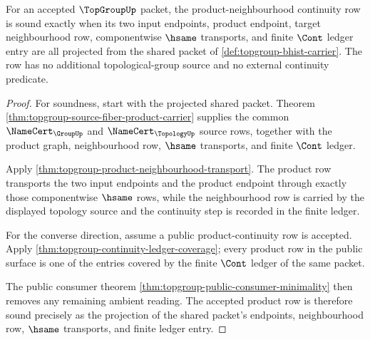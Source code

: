 \begin{theorem}
\label{thm:topgroup-product-cont-ledger-soundness}
For an accepted $\TopGroupUp$ packet, the product-neighbourhood continuity row
is sound exactly when its two input endpoints, product endpoint, target
neighbourhood row, componentwise $\hsame$ transports, and finite $\Cont$ ledger
entry are all projected from the shared packet of
\autoref{def:topgroup-bhist-carrier}. The row has no additional topological-group
source and no external continuity predicate.
\end{theorem}
\begin{proof}
For soundness, start with the projected shared packet. Theorem
\autoref{thm:topgroup-source-fiber-product-carrier} supplies the common
$\NameCert_{\GroupUp}$ and $\NameCert_{\TopologyUp}$ source rows, together with
the product graph, neighbourhood row, $\hsame$ transports, and finite
$\Cont$ ledger.

Apply \autoref{thm:topgroup-product-neighbourhood-transport}. The product row
transports the two input endpoints and the product endpoint through exactly
those componentwise $\hsame$ rows, while the neighbourhood row is carried by the
displayed topology source and the continuity step is recorded in the finite
ledger.

For the converse direction, assume a public product-continuity row is accepted.
Apply \autoref{thm:topgroup-continuity-ledger-coverage}; every product row in
the public surface is one of the entries covered by the finite $\Cont$ ledger of
the same packet.

The public consumer theorem
\autoref{thm:topgroup-public-consumer-minimality} then removes any remaining
ambient reading. The accepted product row is therefore sound precisely as the
projection of the shared packet's endpoints, neighbourhood row, $\hsame$
transports, and finite ledger entry.
\end{proof}


